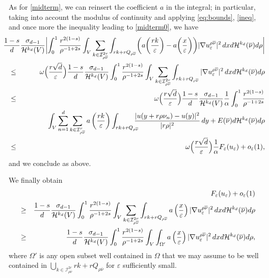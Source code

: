\documentclass[11pt,a4paper,reqno]{amsart}
\theoremstyle{plain}
\theoremstyle{definition}
\newcommand\e{\varepsilon}
\theoremstyle{remark}
\begin{document}
As for \eqref{midterm}, we can reinsert the coefficient $a$ in the integral; in particular, taking into account the modulus of continuity and applying \eqref{eq:bounds}, \eqref{ineq}, and once more the inequality leading to \eqref{midterm0}, we have
\begin{eqnarray*} && \nonumber
    \hskip-1cm \frac{1-s}{d} \frac{\sigma_{d-1}}{\mathcal{H}^{k_d}(V)} \biggl| \int_0^1  \frac{r^{2(1-s)}}{\rho^{-1+2s}}\int_V \sum_{k\in \mathcal{I}^{2r}_{{\rho\overline{\nu}}}} \int_{rk+rQ_{\rho\overline{\nu}}} \biggl(a\biggl(\frac{rk}{\e}\biggr)-a\biggl(\frac{x}{\e}\biggr)\biggr)  |\nabla u_\e^{\rho\overline{\nu}}|^2\,dx   d\mathcal{H}^{k_d}(\overline{\nu}) d\rho \biggr| \\ \nonumber
    &\leq&  \omega\Bigl(\frac{r\sqrt{d}}{\e}\Bigr)\frac{1-s}{d} \frac{\sigma_{d-1}}{\mathcal{H}^{k_d}(V)} \int_0^1  \frac{r^{2(1-s)}}{\rho^{-1+2s}}\int_V \sum_{k\in \mathcal{I}^{2r}_{{\rho\overline{\nu}}}} \int_{rk+rQ_{\rho\overline{\nu}}}  |\nabla u_\e^{\rho\overline{\nu}}|^2\,dx   d\mathcal{H}^{k_d}(\overline{\nu}) d\rho \\ \nonumber
    &\leq&  \omega\Bigl(\frac{r\sqrt{d}}{\e}\Bigr)\frac{1-s}{d} \frac{\sigma_{d-1}}{\mathcal{H}^{k_d}(V)}\frac{1}{\alpha} \int_0^1  \frac{r^{2(1-s)}}{\rho^{-1+2s}} \\ \nonumber
    && \qquad  \int_V \sum_{n=1}^d \sum_{k\in \mathcal{I}^{r}_{{\rho\overline{\nu}}}} a\left(\frac{rk}{\e}\right) \int_{rk+rQ_{\rho\overline{\nu}}} \hskip-0.3cm\frac{|u(y+r\rho \nu_n)-u(y)|^2}{|r\rho|^2}\,dy + E(\overline{\nu}) d\mathcal{H}^{k_d}(\overline{\nu}) d\rho \\ \nonumber
    &\leq& \omega\Bigl(\frac{r\sqrt{d}}{\e}\Bigr)\frac{1}{\alpha} F_\e(u_\e) + o_\e(1),
\end{eqnarray*}
and we conclude as above.

We finally obtain
\begin{eqnarray} && \nonumber
 \hskip-1.7cm   F_\e(u_\e)+o_\e(1) \\ \nonumber
&\geq& \frac{1-s}{d} \frac{\sigma_{d-1}}{\mathcal{H}^{k_d}(V)} \int_0^1  \frac{r^{2(1-s)}}{\rho^{-1+2s}}\int_V \sum_{k\in \mathcal{I}^{2r}_{{\rho\overline{\nu}}}}\int_{rk+rQ_{\rho\overline{\nu}}}  a\left(\frac{x}{\e}\right)  |\nabla u_\e^{\rho\overline{\nu}}|^2\,dx   d\mathcal{H}^{k_d}(\overline{\nu}) d\rho \\  \label{intermediate} 
&\geq& \frac{1-s}{d} \frac{\sigma_{d-1}}{\mathcal{H}^{k_d}(V)} \int_0^1  \frac{r^{2(1-s)}}{\rho^{-1+2s}}\int_V \int_{\Omega'}  a\left(\frac{x}{\e}\right)  |\nabla u_\e^{\rho\overline{\nu}}|^2\,dx   d\mathcal{H}^{k_d}(\overline{\nu}) d\rho,
\end{eqnarray}
where $\Omega'$ is any open subset well contained in $\Omega$ that we may assume to be well contained in $\displaystyle \bigcup_{k \in \mathcal{I}^{2r}_{\rho\overline{\nu}}} rk+rQ_{\rho\overline{\nu}}$ for $\e$ sufficiently small.
\end{document}
